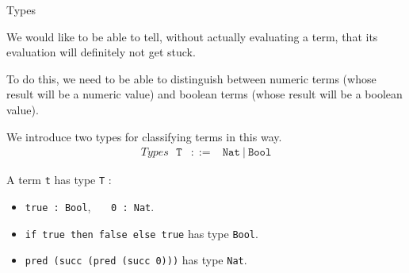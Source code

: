\documentclass[table]{beamer}
\begin{document}
\begin{frame}[t]{Types} \vspace{10pt}

We would like to be able to tell, without actually evaluating a term, that its evaluation will definitely not get stuck. 

\vspace{10pt}

To do this, we need to be able to distinguish between numeric terms (whose result will be a numeric value) and boolean terms (whose result will be a boolean value).

\vspace{10pt}

We introduce two types for classifying terms in this way. 
\begin{eqnarray*}
Types \ \ \ \texttt{T} & ::= & \texttt{Nat} \ | \  \texttt{Bool} 
\end{eqnarray*}

A term \texttt{t} has type \texttt{T} :
\begin{itemize}
\item \texttt{true : Bool}, \ \ \ \texttt{0 : Nat}.
\item \texttt{if true then false else true} has type \texttt{Bool}.
\item \texttt{pred (succ (pred (succ 0)))} has type \texttt{Nat}.
\end{itemize}

\end{frame}
\end{document}
